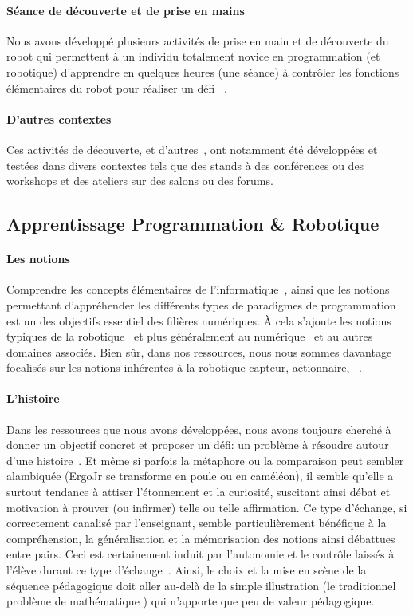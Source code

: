         \paragraph{Séance de découverte et de prise en mains}
            Nous avons développé plusieurs activités de prise en main et de découverte du robot qui permettent à un individu totalement novice en programmation (et robotique) d'apprendre en quelques heures (une séance) à contrôler les fonctions élémentaires du robot pour réaliser un défi \eg  {}~.
        \paragraph{D'autres contextes}
            Ces activités de découverte, et d'autres~, ont notamment été développées et testées dans divers contextes tels que des stands à des conférences ou des workshops et des ateliers sur des salons ou des forums.
    \subsection{Apprentissage Programmation \& Robotique}
        \paragraph{Les notions}
            Comprendre les concepts élémentaires de l'informatique~, ainsi que les notions permettant d'appréhender les différents types de paradigmes de programmation~ est un des objectifs essentiel des filières numériques. À cela s'ajoute les notions typiques de la robotique~ et plus généralement au numérique~ et au autres domaines associés.%
            Bien sûr, dans nos ressources, nous nous sommes davantage focalisés sur les notions inhérentes à la robotique \eg capteur, actionnaire, ~.
        \paragraph{L'histoire}
            Dans les ressources que nous avons développées, nous avons toujours cherché à donner un objectif concret et proposer un défi: un problème à résoudre autour d'une histoire~. Et même si parfois la métaphore ou la comparaison peut sembler alambiquée (\eg ErgoJr se transforme en poule ou en caméléon), il semble qu'elle a surtout tendance à attiser l'étonnement et la curiosité, suscitant ainsi débat et motivation à prouver (ou infirmer) telle ou telle affirmation. Ce type d'échange, si correctement canalisé par l'enseignant, semble particulièrement bénéfique à la compréhension, la généralisation et la mémorisation des notions ainsi débattues entre pairs. Ceci est certainement induit par l'autonomie et le contrôle laissés à l'élève durant ce type d'échange~. Ainsi, le choix et la mise en scène de la séquence pédagogique doit aller au-delà de la simple illustration (\eg le traditionnel problème de mathématique ) qui n'apporte que peu de valeur pédagogique.
